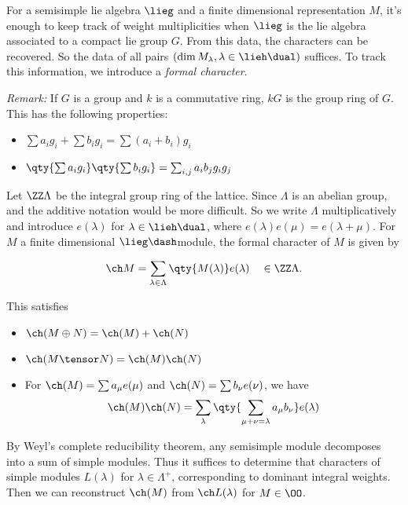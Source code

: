 For a semisimple lie algebra \(\lieg\) and a finite dimensional
representation \(M\), it's enough to keep track of weight multiplicities
when \(\lieg\) is the lie algebra associated to a compact lie group
\(G\). From this data, the characters can be recovered. So the data of
all pairs \((\dim M_\lambda, \lambda \in \lieh\dual)\) suffices. To
track this information, we introduce a \emph{formal character}.

\emph{Remark:} If \(G\) is a group and \(k\) is a commutative ring,
\(kG\) is the group ring of \(G\). This has the following properties:

\begin{itemize}
\tightlist
\item
  \(\sum a_i g_i + \sum b_i g_i = \sum(a_i + b_i) g_i\)
\item
  \(\qty{ \sum a_i g_i } \qty{ \sum b_i g_i } = \sum_{i, j} a_i b_j g_i g_j\)
\end{itemize}

Let \(\ZZ \Lambda\) be the integral group ring of the lattice. Since
\(\Lambda\) is an abelian group, and the additive notation would be more
difficult. So we write \(\Lambda\) multiplicatively and introduce
\(e(\lambda)\) for \(\lambda \in \lieh\dual\), where
\(e(\lambda) e(\mu) = e(\lambda + \mu)\). For \(M\) a finite dimensional
\(\lieg\dash\)module, the formal character of \(M\) is given by

\begin{align*}
\ch M = \sum_{\lambda\in \Lambda} \qty{ M(\lambda)  } e(\lambda) \quad\in \ZZ\Lambda
.\end{align*}

This satisfies

\begin{itemize}
\tightlist
\item
  \(\ch(M\oplus N) = \ch(M) + \ch(N)\)
\item
  \(\ch(M\tensor N) = \ch(M)\ch(N)\)
\item
  For \(\ch(M) = \sum a_\mu e(\mu)\) and \(\ch(N) = \sum b_\nu e(\nu)\),
  we have
  \begin{align*}\ch(M) \ch(N) = \sum_{\lambda} \qty{ \sum_{\mu + \nu = \lambda} a_\mu b_\nu } e(\lambda)\end{align*}
\end{itemize}

By Weyl's complete reducibility theorem, any semisimple module
decomposes into a sum of simple modules. Thus it suffices to determine
that characters of simple modules \(L(\lambda)\) for
\(\lambda \in \Lambda^+\), corresponding to dominant integral weights.
Then we can reconstruct \(\ch(M)\) from \(\ch L(\lambda)\) for
\(M\in \OO\).

